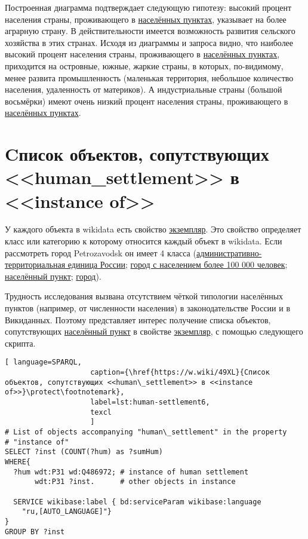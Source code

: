 Построенная диаграмма подтверждает следующую гипотезу: высокий процент населения страны, проживающего в \href{http://www.wikidata.org/entity/Q486972}{населённых пунктах}, указывает на более аграрную страну. В действительности имеется возможность развития сельского хозяйства в этих странах. Исходя из диаграммы и запроса видно, что наиболее высокий процент населения страны, проживающего в \href{http://www.wikidata.org/entity/Q486972}{населённых пунктах}, приходится на островные, южные, жаркие страны, в которых, по-видимому, менее развита промышленность (маленькая территория, небольшое количество населения, удаленность от материков). А индустриальные страны (большой восьмёрки) имеют очень низкий процент населения страны, проживающего в \href{http://www.wikidata.org/entity/Q486972}{населённых пунктах}.

\section{Cписок объектов, сопутствующих <<human\_settlement>> в <<instance of>>}

У каждого объекта в wikidata есть свойство \href{http://www.wikidata.org/entity/Q21503252}{экземпляр}. Это свойство определяет класс или категорию к которому относится каждый объект в wikidata. Если рассмотреть город Petrozavodsk он имеет 4 класса (\href{http://www.wikidata.org/entity/Q192287}{административно-территориальная единица России}; \href{http://www.wikidata.org/entity/Q1549591}{город с населением более 100 000 человек}; \href{http://www.wikidata.org/entity/Q486972}{населённый пункт}; \href{http://www.wikidata.org/entity/Q7930989}{город}).

Трудность исследования вызвана отсутствием чёткой типологии населённых пунктов (например, от численности населения) в законодательстве России и в Викиданных. Поэтому представляет интерес получение списка объектов, сопутствующих \href{http://www.wikidata.org/entity/Q486972}{населённый пункт} в свойстве \href{http://www.wikidata.org/entity/Q21503252}{экземпляр}, с помощью следующего скрипта.

\begin{lstlisting}[ language=SPARQL, 
                    caption={\href{https://w.wiki/49XL}{Cписок объектов, сопутствующих <<human\_settlement>> в <<instance of>>}\protect\footnotemark},
                    label=lst:human-settlement6,
                    texcl 
                    ]
# List of objects accompanying "human\_settlement" in the property
# "instance of"
SELECT ?inst (COUNT(?hum) as ?sumHum) 
WHERE{          
  ?hum wdt:P31 wd:Q486972; # instance of human settlement
       wdt:P31 ?inst.      # other objects in instance
  
  SERVICE wikibase:label { bd:serviceParam wikibase:language 
	"ru,[AUTO_LANGUAGE]"}
}  
GROUP BY ?inst
\end{lstlisting}%


